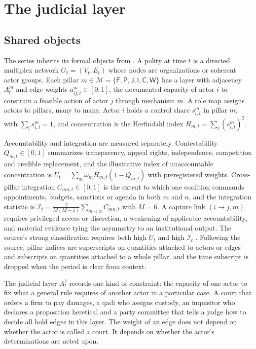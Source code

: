 \documentclass[11pt,letterpaper]{article}
\theoremstyle{definition}
\theoremstyle{remark}
\newcommand{\pF}{\mathsf{F}}
\newcommand{\pP}{\mathsf{P}}
\newcommand{\pJ}{\mathsf{J}}
\newcommand{\pI}{\mathsf{I}}
\newcommand{\pC}{\mathsf{C}}
\newcommand{\pW}{\mathsf{W}}
\newcommand{\Mset}{\mathcal{M}}
\newcommand{\Integ}{\mathcal{I}}
\begin{document}
\section{The judicial layer}
\label{sec:layer}

\subsection{Shared objects}

The series inherits its formal objects from \citet{largo2026hbs}. A polity at time $t$ is a directed multiplex network $G_t=(V_t,E_t)$ whose nodes are organizations or coherent actor groups. Each pillar $m\in\Mset=\{\pF,\pP,\pJ,\pI,\pC,\pW\}$ has a layer with adjacency $A^m_t$ and edge weights $a^m_{ij,t}\in[0,1]$, the documented capacity of actor $i$ to constrain a feasible action of actor $j$ through mechanism $m$. A role map assigns actors to pillars, many to many. Actor $i$ holds a control share $s^m_{i,t}$ in pillar $m$, with $\sum_i s^m_{i,t}=1$, and concentration is the Herfindahl index $H_{m,t}=\sum_i (s^m_{i,t})^2$.

Accountability and integration are measured separately. Contestability $Q_{m,t}\in[0,1]$ summarizes transparency, appeal rights, independence, competition and credible replacement, and the illustrative index of unaccountable concentration is $U_t=\sum_m \omega_m H_{m,t}(1-Q_{m,t})$ with preregistered weights. Cross-pillar integration $C_{mn,t}\in[0,1]$ is the extent to which one coalition commands appointments, budgets, sanctions or agenda in both $m$ and $n$, and the integration statistic is $\Integ_t=\frac{2}{M(M-1)}\sum_{m<n}C_{mn,t}$ with $M=6$. A capture link $(i\to j,m)$ requires privileged access or discretion, a weakening of applicable accountability, and material evidence tying the asymmetry to an institutional output. The source's strong classification requires both high $U_t$ and high $\Integ_t$ \citep{largo2026hbs}. Following the source, pillar indices are superscripts on quantities attached to actors or edges and subscripts on quantities attached to a whole pillar, and the time subscript is dropped when the period is clear from context.

The judicial layer $A^{\pJ}_t$ records one kind of constraint: the capacity of one actor to fix what a general rule requires of another actor in a particular case. A court that orders a firm to pay damages, a qadi who assigns custody, an inquisitor who declares a proposition heretical and a party committee that tells a judge how to decide all hold edges in this layer. The weight of an edge does not depend on whether the actor is called a court. It depends on whether the actor's determinations are acted upon.
\end{document}
